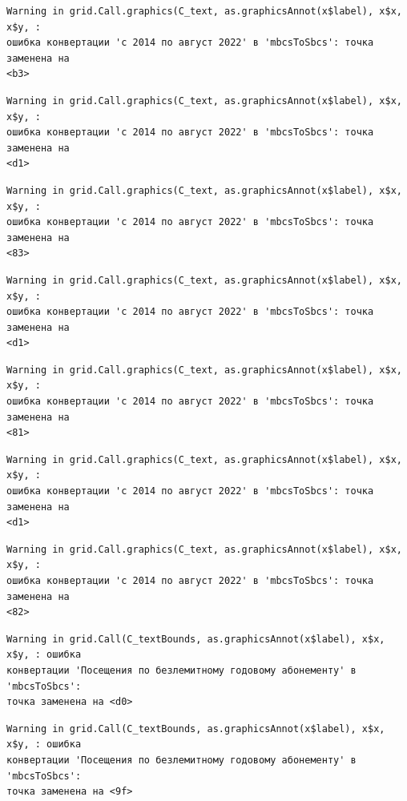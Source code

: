 \documentclass[
  letterpaper,
  DIV=11,
  numbers=noendperiod]{scrreprt}
\begin{document}
\begin{verbatim}
Warning in grid.Call.graphics(C_text, as.graphicsAnnot(x$label), x$x, x$y, :
ошибка конвертации 'с 2014 по август 2022' в 'mbcsToSbcs': точка заменена на
<b3>
\end{verbatim}

\begin{verbatim}
Warning in grid.Call.graphics(C_text, as.graphicsAnnot(x$label), x$x, x$y, :
ошибка конвертации 'с 2014 по август 2022' в 'mbcsToSbcs': точка заменена на
<d1>
\end{verbatim}

\begin{verbatim}
Warning in grid.Call.graphics(C_text, as.graphicsAnnot(x$label), x$x, x$y, :
ошибка конвертации 'с 2014 по август 2022' в 'mbcsToSbcs': точка заменена на
<83>
\end{verbatim}

\begin{verbatim}
Warning in grid.Call.graphics(C_text, as.graphicsAnnot(x$label), x$x, x$y, :
ошибка конвертации 'с 2014 по август 2022' в 'mbcsToSbcs': точка заменена на
<d1>
\end{verbatim}

\begin{verbatim}
Warning in grid.Call.graphics(C_text, as.graphicsAnnot(x$label), x$x, x$y, :
ошибка конвертации 'с 2014 по август 2022' в 'mbcsToSbcs': точка заменена на
<81>
\end{verbatim}

\begin{verbatim}
Warning in grid.Call.graphics(C_text, as.graphicsAnnot(x$label), x$x, x$y, :
ошибка конвертации 'с 2014 по август 2022' в 'mbcsToSbcs': точка заменена на
<d1>
\end{verbatim}

\begin{verbatim}
Warning in grid.Call.graphics(C_text, as.graphicsAnnot(x$label), x$x, x$y, :
ошибка конвертации 'с 2014 по август 2022' в 'mbcsToSbcs': точка заменена на
<82>
\end{verbatim}

\begin{verbatim}
Warning in grid.Call(C_textBounds, as.graphicsAnnot(x$label), x$x, x$y, : ошибка
конвертации 'Посещения по безлемитному годовому абонементу' в 'mbcsToSbcs':
точка заменена на <d0>
\end{verbatim}

\begin{verbatim}
Warning in grid.Call(C_textBounds, as.graphicsAnnot(x$label), x$x, x$y, : ошибка
конвертации 'Посещения по безлемитному годовому абонементу' в 'mbcsToSbcs':
точка заменена на <9f>
\end{verbatim}
\end{document}
